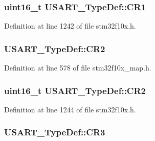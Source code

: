 \subsubsection[{\texorpdfstring{C\+R1}{CR1}}]{ {\bf uint16\+\_\+t} U\+S\+A\+R\+T\+\_\+\+Type\+Def\+::\+C\+R1}\hypertarget{struct_u_s_a_r_t___type_def_a5de50313b1437f7f926093f00902d37a}{}\label{struct_u_s_a_r_t___type_def_a5de50313b1437f7f926093f00902d37a}


Definition at line 1242 of file stm32f10x.\+h.

\subsubsection[{\texorpdfstring{C\+R2}{CR2}}]{ U\+S\+A\+R\+T\+\_\+\+Type\+Def\+::\+C\+R2}\hypertarget{struct_u_s_a_r_t___type_def_af4e887491196c5b6401834fb9c11bce7}{}\label{struct_u_s_a_r_t___type_def_af4e887491196c5b6401834fb9c11bce7}


Definition at line 578 of file stm32f10x\+\_\+map.\+h.

\subsubsection[{\texorpdfstring{C\+R2}{CR2}}]{ {\bf uint16\+\_\+t} U\+S\+A\+R\+T\+\_\+\+Type\+Def\+::\+C\+R2}\hypertarget{struct_u_s_a_r_t___type_def_a2a494156d185762e4596696796c393bc}{}\label{struct_u_s_a_r_t___type_def_a2a494156d185762e4596696796c393bc}


Definition at line 1244 of file stm32f10x.\+h.

\subsubsection[{\texorpdfstring{C\+R3}{CR3}}]{ U\+S\+A\+R\+T\+\_\+\+Type\+Def\+::\+C\+R3}\hypertarget{struct_u_s_a_r_t___type_def_a380c2011d64b3aca33b63ab82f8c0557}{}\label{struct_u_s_a_r_t___type_def_a380c2011d64b3aca33b63ab82f8c0557}


